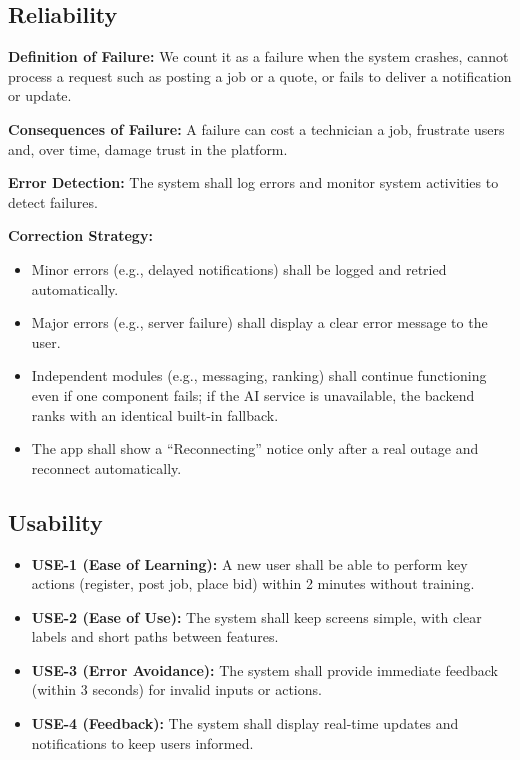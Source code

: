 \documentclass[A4paper,12pt]{report}
\theoremstyle{plain}
\theoremstyle{definition}
\theoremstyle{remark}
\numberwithin{equation}{section}
\begin{document}
\subsection{Reliability}

\textbf{Definition of Failure:} We count it as a failure when the system crashes, cannot process a request such as posting a job or a quote, or fails to deliver a notification or update.

\textbf{Consequences of Failure:} A failure can cost a technician a job, frustrate users and, over time, damage trust in the platform.

\textbf{Error Detection:} The system shall log errors and monitor system activities to detect failures.

\textbf{Correction Strategy:}
\begin{itemize}
    \item Minor errors (e.g., delayed notifications) shall be logged and retried automatically.
    \item Major errors (e.g., server failure) shall display a clear error message to the user.
        \item Independent modules (e.g., messaging, ranking) shall continue functioning even if one component fails; if the AI service is unavailable, the backend ranks with an identical built-in fallback.
    \item The app shall show a ``Reconnecting'' notice only after a real outage and reconnect automatically.
\end{itemize}

\subsection{Usability}

\begin{itemize}
    \item \textbf{USE-1 (Ease of Learning):} A new user shall be able to perform key actions (register, post job, place bid) within 2 minutes without training.
    
    \item \textbf{USE-2 (Ease of Use):} The system shall keep screens simple, with clear labels and short paths between features.
    
    \item \textbf{USE-3 (Error Avoidance):} The system shall provide immediate feedback (within 3 seconds) for invalid inputs or actions.
    
    \item \textbf{USE-4 (Feedback):} The system shall display real-time updates and notifications to keep users informed.
\end{itemize}
\end{document}
